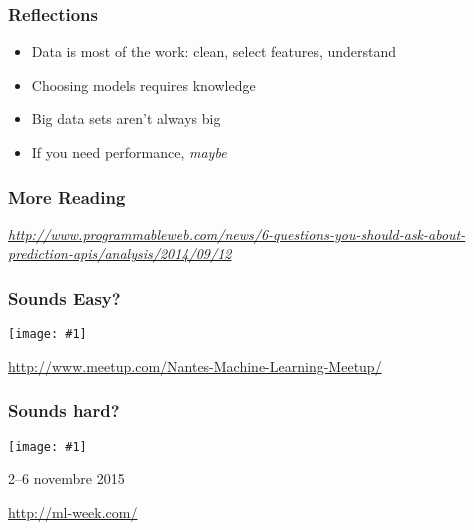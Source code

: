 \documentclass{beamer}
\newcommand\smallgray[1]{\textcolor{gray}{\footnotesize\it #1}}
\newcommand\prevwork[1]{\smallgray{#1}}
\newcommand\solo[1]{\centerline{#1}}
\newcommand\cimg[1]{\centerline{\texttt{[image: \#1]}}}
\newcommand\cimggg[1]{\centerline{\texttt{[image: \#1]}}}
\newcommand\cimgsm[1]{\centerline{\texttt{[image: \#1]}}}
\begin{document}


\begin{frame}
  \frametitle{Reflections}

  \begin{itemize}
  \item Data is most of the work: clean, select features, understand
  \item Choosing models requires knowledge
  \item Big data sets aren't always big
  \item If you need performance, \textit{maybe}
  \end{itemize}

\end{frame}

\begin{frame}
  \frametitle{More Reading}

  \prevwork{\url{http://www.programmableweb.com/news/6-questions-you-should-ask-about-prediction-apis/analysis/2014/09/12}}
  
\end{frame}

\begin{frame}[t]
  \frametitle{Sounds Easy?}

  \vspace{1cm}
  \cimg{nmlm.png}

  \prevwork{\centerline{\url{http://www.meetup.com/Nantes-Machine-Learning-Meetup/}}}

\end{frame}

\begin{frame}
  \frametitle{Sounds hard?}

  \cimggg{ml-week.png}
  \vspace{5mm}
  \centerline{2--6 novembre 2015}

  \prevwork{\centerline{\url{http://ml-week.com/}}}
\end{frame}
\end{document}
